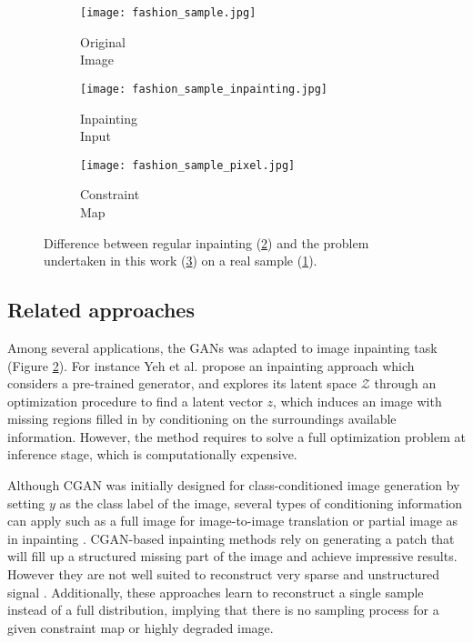 \begin{figure}[t]
	\centering
	\begin{subfigure}[t]{0.33\textwidth}
		\centering
		\texttt{[image: fashion\_sample.jpg]}
		\caption{Original \\ Image}
		\label{fig:digit}
	\end{subfigure}\begin{subfigure}[t]{0.33\textwidth}
		\centering
		\texttt{[image: fashion\_sample\_inpainting.jpg]}
		\caption{Inpainting\\Input}
		\label{fig:inpainting}
	\end{subfigure}\begin{subfigure}[t]{0.33\textwidth}
		\centering
		\texttt{[image: fashion\_sample\_pixel.jpg]}
		\caption{Constraint\\Map}
		\label{fig:pixelwise_gen}
	\end{subfigure}
	\caption{Difference between regular inpainting (\ref{fig:inpainting}) and the problem undertaken in this work (\ref{fig:pixelwise_gen}) on a real sample (\ref{fig:digit}).}
	\label{fig:image_completion_task}
\end{figure}

\subsection{Related approaches}

Among several applications, the GANs was adapted  to image inpainting task (Figure \ref{fig:inpainting}). For instance Yeh et al. \citep{Yeh2017} propose an inpainting approach which considers a pre-trained generator, and explores its latent space $\mathcal{Z}$ through an optimization procedure to find a latent vector $z$, which induces an image with missing regions filled in by conditioning on the surroundings available information. However, the method requires to solve a full optimization problem at inference stage, which is computationally expensive.

Although CGAN was initially designed for class-conditioned image generation by setting $y$ as the class label of the image, several types of conditioning information can apply such as a full image for image-to-image translation \citep{Isola2017} or partial image as in inpainting \citep{Yu2018}. CGAN-based inpainting methods rely on generating a patch that will fill up a structured missing part of the image and achieve impressive results. However they are not well suited to reconstruct very sparse and unstructured signal \citep{Demir2018}. Additionally, these approaches learn to reconstruct a single sample instead of a full distribution, implying that there is no sampling process for a given constraint map or highly degraded image.

